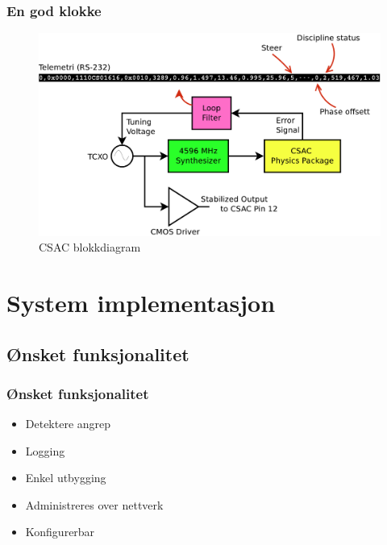 \documentclass[xcolor=table]{beamer}
\begin{document}
\begin{frame}
  \frametitle{En god klokke}
      \begin{figure}
        \includegraphics[scale=0.35]{thesis/graphics/csac_schematic.pdf}
      \caption{CSAC blokkdiagram}
    \end{figure}
\end{frame}

\section{System implementasjon}
\subsection{Ønsket funksjonalitet}
\begin{frame}
  \frametitle{Ønsket funksjonalitet}
  \begin{itemize}
    \item Detektere angrep
    \item Logging
    \item Enkel utbygging
    \item Administreres over nettverk
    \item Konfigurerbar 
  \end{itemize}
\end{frame}
\end{document}

